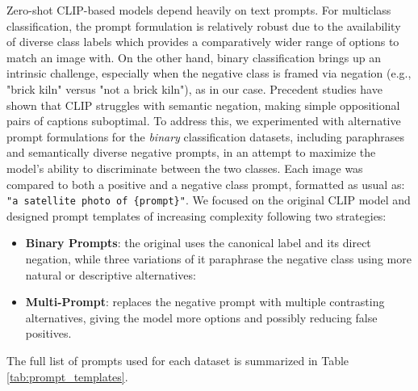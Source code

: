 \documentclass[a4paper, oneside, english]{sapthesis} %
\begin{document}
Zero-shot CLIP-based models depend heavily on text prompts. For multiclass classification, the prompt formulation is relatively robust due to the availability of diverse class labels which provides a comparatively wider range of options to match an image with. On the other hand, binary classification brings up an intrinsic challenge, especially when the negative class is framed via negation (e.g., "brick kiln" versus "not a brick kiln"), as in our case.
Precedent studies \cite{quantmeyer2024and} have shown that CLIP struggles with semantic negation, making simple oppositional pairs of captions suboptimal. To address this, we experimented with alternative prompt formulations for the \emph{binary} classification datasets, including paraphrases and semantically diverse negative prompts, in an attempt to maximize the model's ability to discriminate between the two classes.
Each image was compared to both a positive and a negative class prompt, formatted as usual as: \texttt{"a satellite photo of \{prompt\}"}.
We focused on the original CLIP model and designed prompt templates of increasing complexity following two strategies:
\begin{itemize}
    \item \textbf{Binary Prompts}: the original uses the canonical label and its direct negation, while three variations of it paraphrase the negative class using more natural or descriptive alternatives:
    \item \textbf{Multi-Prompt}: replaces the negative prompt with multiple contrasting alternatives, giving the model more options and possibly reducing false positives.
\end{itemize}

The full list of prompts used for each dataset is summarized in Table \ref{tab:prompt_templates}.
\end{document}
